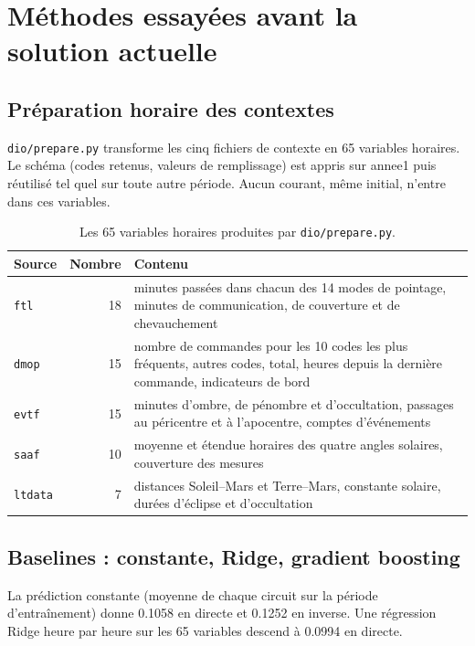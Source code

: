 \documentclass[11pt,a4paper]{article}
\newcommand{\code}[1]{\texttt{#1}}
\begin{document}
\section{Méthodes essayées avant la solution actuelle}

\subsection{Préparation horaire des contextes}

\code{dio/prepare.py} transforme les cinq fichiers de contexte en 65 variables horaires. Le schéma (codes retenus, valeurs de remplissage) est appris sur annee1 puis réutilisé tel quel sur toute autre période. Aucun courant, même initial, n'entre dans ces variables.

\begin{table}[!htb]
\centering\small
\caption{Les 65 variables horaires produites par \code{dio/prepare.py}.}
\label{tab:variables}
\begin{tabularx}{\linewidth}{l r X}
\toprule
Source & Nombre & Contenu \\
\midrule
\code{ftl}    & 18 & minutes passées dans chacun des 14 modes de pointage, minutes de communication, de couverture et de chevauchement \\
\code{dmop}   & 15 & nombre de commandes pour les 10 codes les plus fréquents, autres codes, total, heures depuis la dernière commande, indicateurs de bord \\
\code{evtf}   & 15 & minutes d'ombre, de pénombre et d'occultation, passages au péricentre et à l'apocentre, comptes d'événements \\
\code{saaf}   & 10 & moyenne et étendue horaires des quatre angles solaires, couverture des mesures \\
\code{ltdata} & 7  & distances Soleil--Mars et Terre--Mars, constante solaire, durées d'éclipse et d'occultation \\
\bottomrule
\end{tabularx}
\end{table}

\subsection{Baselines : constante, Ridge, gradient boosting}

La prédiction constante (moyenne de chaque circuit sur la période d'entraînement) donne 0.1058 en directe et 0.1252 en inverse. Une régression Ridge heure par heure sur les 65 variables descend à 0.0994 en directe.
\end{document}
